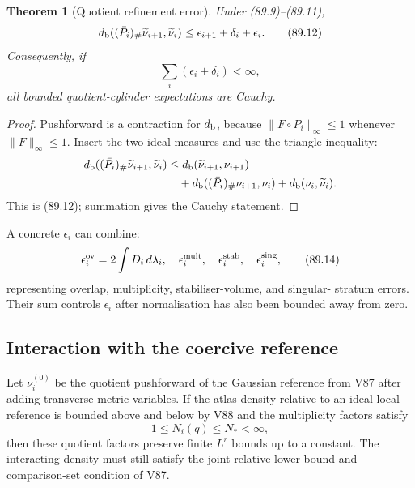 \documentclass[11pt]{article}
\newtheorem{theorem}{Theorem}[section]
\begin{document}
\begin{theorem}[Quotient refinement error]
\label{thm:v11v89-refine}
Under (89.9)--(89.11),
\[
 d_{\rm b}((\bar P_i)_\#\widetilde\nu_{i+1},
                         \widetilde\nu_i)
                    \le\epsilon_{i+1}+\delta_i+\epsilon_i.  \tag{89.12}
\]
Consequently, if
\[
                              \sum_i(\epsilon_i+\delta_i)<\infty,
                                                                    \tag{89.13}
\]
all bounded quotient-cylinder expectations are Cauchy.
\end{theorem}

\begin{proof}
Pushforward is a contraction for \(d_{\rm b}\), because
\(\|F\circ\bar P_i\|_\infty\le1\) whenever \(\|F\|_\infty\le1\).
Insert the two ideal measures and use the triangle inequality:
\[
 \begin{split}
 d_{\rm b}((\bar P_i)_\#\widetilde\nu_{i+1},\widetilde\nu_i)
 &\le d_{\rm b}(\widetilde\nu_{i+1},\nu_{i+1})\\
 &\quad+d_{\rm b}((\bar P_i)_\#\nu_{i+1},\nu_i)
       +d_{\rm b}(\nu_i,\widetilde\nu_i).
 \end{split}
\]
This is (89.12); summation gives the Cauchy statement.
\end{proof}

A concrete \(\epsilon_i\) can combine:
\[
 \epsilon_i^{\rm ov}
       =2\int D_i\,d\lambda_i,\quad
 \epsilon_i^{\rm mult},\quad
 \epsilon_i^{\rm stab},\quad
 \epsilon_i^{\rm sing},                                    \tag{89.14}
\]
representing overlap, multiplicity, stabiliser-volume, and singular-
stratum errors.  Their sum controls \(\epsilon_i\) after normalisation
has also been bounded away from zero.

\subsection{Interaction with the coercive reference}

Let \(\nu_i^{(0)}\) be the quotient pushforward of the Gaussian
reference from V87 after adding transverse metric variables.  If the
atlas density relative to an ideal local reference is bounded above
and below by V88 and the multiplicity factors satisfy
\[
                         1\le N_i(q)\le N_*<\infty,          \tag{89.15}
\]
then these quotient factors preserve finite \(L^r\) bounds up to a
constant.  The interacting density must still satisfy the joint
relative lower bound and comparison-set condition of V87.
\end{document}
